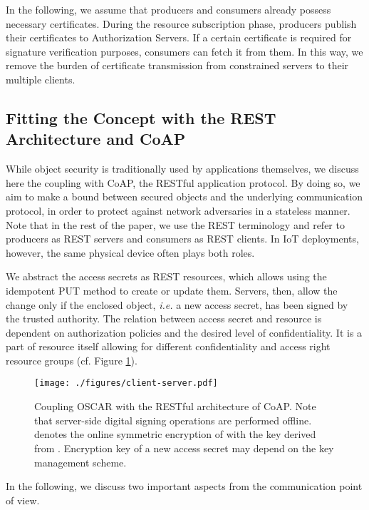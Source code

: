 \documentclass[conference]{IEEEtran}
\begin{document}
In the following, we assume that producers and consumers already possess necessary certificates. 
During the resource subscription phase, producers publish their certificates to
Authorization Servers. If a certain certificate is required for signature
verification purposes, consumers can fetch it from them. In this way, we remove the burden of certificate transmission from constrained servers to their multiple clients.



\subsection{Fitting the Concept with the REST Architecture and CoAP}
\label{coupling-with-coap}
While object security is traditionally used by applications themselves, we
discuss here the coupling with CoAP, the RESTful application protocol. By doing
so, we aim to make a bound between secured objects and the underlying communication
protocol, in order to protect against network adversaries in a stateless manner.
Note that in the rest of the paper, we use the REST terminology and
refer to producers as REST servers and consumers as REST clients. 
In IoT deployments, however, the same physical device often plays both roles. 




We abstract the access secrets as REST resources, which allows using the
idempotent PUT method to create or update them. Servers, then, allow the change
only if the enclosed object, \emph{i.e.} a new access secret, has been signed
by the trusted authority. The relation
between  access secret  and  resource  is dependent
on authorization policies and the desired level of confidentiality. It is a
part of resource  itself allowing for different confidentiality and
access right resource groups (cf. Figure \ref{fig:client-server}).


\begin{figure}[htbp]
\centering
\texttt{[image: ./figures/client-server.pdf]}
\caption{Coupling OSCAR with the RESTful architecture of CoAP. Note that
  server-side digital signing operations are performed offline.  
  denotes the online symmetric encryption of  with the key derived from
  . Encryption key  of a new access secret  may depend on the key management scheme.}
\label{fig:client-server}
\end{figure}


In the following, we discuss two important aspects from the communication point of view. 
\end{document}
